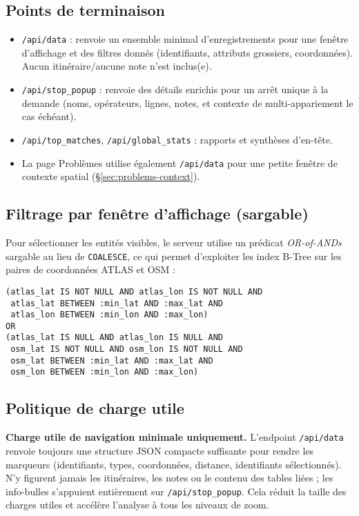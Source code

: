 \subsection{Points de terminaison}
\begin{itemize}
  \item \texttt{/api/data} : renvoie un ensemble minimal d’enregistrements pour une fenêtre d’affichage et des filtres donnés (identifiants, attributs grossiers, coordonnées). Aucun itinéraire/aucune note n’est inclus(e).
  \item \texttt{/api/stop\_popup} : renvoie des détails enrichis pour un arrêt unique à la demande (noms, opérateurs, lignes, notes, et contexte de multi-appariement le cas échéant).
  \item \texttt{/api/top\_matches}, \texttt{/api/global\_stats} : rapports et synthèses d’en-tête.
  \item La page Problèmes utilise également \texttt{/api/data} pour une petite fenêtre de contexte spatial (\S\ref{sec:problems-context}).
\end{itemize}

\subsection{Filtrage par fenêtre d’affichage (sargable)}
Pour sélectionner les entités visibles, le serveur utilise un prédicat \emph{OR-of-ANDs} sargable au lieu de \verb|COALESCE|, ce qui permet d’exploiter les index B-Tree sur les paires de coordonnées ATLAS et OSM :

\begin{verbatim}
(atlas_lat IS NOT NULL AND atlas_lon IS NOT NULL AND
 atlas_lat BETWEEN :min_lat AND :max_lat AND
 atlas_lon BETWEEN :min_lon AND :max_lon)
OR
(atlas_lat IS NULL AND atlas_lon IS NULL AND
 osm_lat IS NOT NULL AND osm_lon IS NOT NULL AND
 osm_lat BETWEEN :min_lat AND :max_lat AND
 osm_lon BETWEEN :min_lon AND :max_lon)
\end{verbatim}

\subsection{Politique de charge utile}
\textbf{Charge utile de navigation minimale uniquement.} L’endpoint \texttt{/api/data} renvoie toujours une structure JSON compacte suffisante pour rendre les marqueurs (identifiants, types, coordonnées, distance, identifiants sélectionnés). N’y figurent jamais les itinéraires, les notes ou le contenu des tables liées ; les info-bulles s’appuient entièrement sur \texttt{/api/stop\_popup}. Cela réduit la taille des charges utiles et accélère l’analyse à tous les niveaux de zoom.

